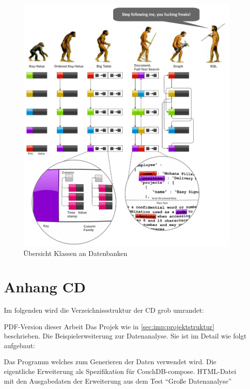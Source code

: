 \begin{figure}
    \centering
    \includegraphics[width=\textwidth]{images/databases-overview.png}
    \caption{Übersicht Klassen an Datenbanken}
    \label{fig:klassen-datenbanken}
\end{figure}

\chapter{Anhang CD}

Im folgenden wird die Verzeichnissstruktur der CD grob umrandet:

\begin{itemize}
     PDF-Version dieser Arbeit
    \dhitem[juggler] Das Projek wie in \cref{sec:imp:projektstruktur} beschrieben.
    \dhitem[evolve] Die Beispielerweiterung zur Datenanalyse.
    Sie ist im Detail wie folgt aufgebaut:
    \begin{itemize}
            \dhitem[funfind.py] Das Programm welches zum Generieren der Daten verwendet wird.
            \dhitem[composeapp] Die eigentliche Erweiterung als Spezifikation für CouchDB-compose.
             HTML-Datei mit den Ausgabedaten der Erweiterung aus dem Test ``Große Datenanalyse''
    \end{itemize}
\end{itemize}
